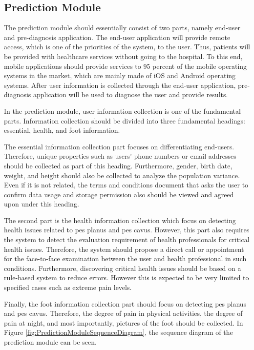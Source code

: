 \subsection{ Prediction Module }

The prediction module should essentially consist of two parts, namely end-user and pre-diagnosis application. The end-user application will provide remote access, which is one of the priorities of the system, to the user. Thus, patients will be provided with healthcare services without going to the hospital. To this end, mobile applications should provide services to 95 percent of the mobile operating systems in the market, which are mainly made of iOS and Android operating systems. After user information is collected through the end-user application, pre-diagnosis application will be used to diagnose the user and provide results.

In the prediction module, user information collection is one of the fundamental parts. Information collection should be divided into three fundamental headings: essential, health, and foot information. 

The essential information collection part focuses on differentiating end-users. Therefore, unique properties such as users' phone numbers or email addresses should be collected as part of this heading. Furthermore, gender, birth date, weight, and height should also be collected to analyze the population variance. Even if it is not related, the terms and conditions document that asks the user to confirm data usage and storage permission also should be viewed and agreed upon under this heading.

The second part is the health information collection which focus on detecting health issues related to pes planus and pes cavus. However, this part also requires the system to detect the evaluation requirement of health professionals for critical health issues. Therefore, the system should propose a direct call or appointment for the face-to-face examination between the user and health professional in such conditions. Furthermore, discovering critical health issues should be based on a rule-based system to reduce errors. However this is expected to be very limited to specified cases such as extreme pain levels.

Finally, the foot information collection part should focus on detecting pes planus and pes cavus. Therefore, the degree of pain in physical activities, the degree of pain at night, and most importantly, pictures of the foot should be collected. In Figure \ref{fig:PredictionModuleSequenceDiagram}, the sequence diagram of the prediction module can be seen.

